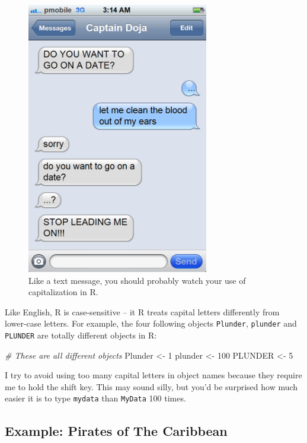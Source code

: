 \documentclass[]{book}
\newenvironment{Shaded}{\begin{snugshade}}{\end{snugshade}}
\newcommand{\DecValTok}[1]{\textcolor[rgb]{0.00,0.00,0.81}{{#1}}}
\newcommand{\StringTok}[1]{\textcolor[rgb]{0.31,0.60,0.02}{{#1}}}
\newcommand{\CommentTok}[1]{\textcolor[rgb]{0.56,0.35,0.01}{\textit{{#1}}}}
\newcommand{\NormalTok}[1]{{#1}}
\theoremstyle{definition}
\theoremstyle{definition}
\theoremstyle{remark}
\begin{document}
\begin{figure}

{\centering \includegraphics[width=300px]{images/datetext} 

}

\caption{Like a text message, you should probably watch your use of capitalization in R.}\label{fig:datetext}
\end{figure}

Like English, R is case-sensitive -- it R treats capital letters
differently from lower-case letters. For example, the four following
objects \texttt{Plunder}, \texttt{plunder} and \texttt{PLUNDER} are
totally different objects in R:

\begin{Shaded}
\begin{Highlighting}[]
\CommentTok{# These are all different objects}
\NormalTok{Plunder <-}\StringTok{ }\DecValTok{1}
\NormalTok{plunder <-}\StringTok{ }\DecValTok{100}
\NormalTok{PLUNDER <-}\StringTok{ }\DecValTok{5}
\end{Highlighting}
\end{Shaded}

I try to avoid using too many capital letters in object names because
they require me to hold the shift key. This may sound silly, but you'd
be surprised how much easier it is to type \texttt{mydata} than
\texttt{MyData} 100 times.

\subsection{Example: Pirates of The
Caribbean}\label{example-pirates-of-the-caribbean}
\end{document}
